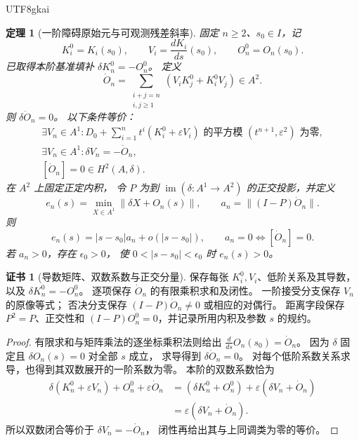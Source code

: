 \documentclass[12pt,a4paper,openany,notitlepage]{report}
\theoremstyle{plain}
\newtheorem{theorem}{定理}[chapter]
\theoremstyle{definition}
\newtheorem*{certificate}{证书}
\theoremstyle{remark}
\def\mathcal#1{#1}\def\mathsf#1{#1}\def\mathbb#1{#1}%
\begin{document}
\begin{CJK*}{UTF8}{gkai}
\begin{theorem}[一阶障碍原始元与可观测残差斜率]
\label{exp:hom:first-variation}
固定 $n\ge2$、$s_0\in I$，记
\[
 K_i^0=K_i(s_0),\qquad
 V_i=\frac{dK_i}{ds}(s_0),\qquad
 O_n^0=O_n(s_0).
\]
已取得本阶基准填补 $\delta K_n^0=-O_n^0$。
定义
\[
 \dot O_n
 =\sum_{\substack{i+j=n\\i,j\ge1}}
       (V_iK_j^0+K_i^0V_j)\in\mathcal A^2.
\]
则 $\delta\dot O_n=0$。
以下条件等价：
\[
 \begin{gathered}
 \exists V_n\in\mathcal A^1:
 D_0+\sum_{i=1}^{n}t^i(K_i^0+\varepsilon V_i)
 \text{ 的平方模 }(t^{n+1},\varepsilon^2)\text{ 为零},\\
 \exists V_n\in\mathcal A^1:\delta V_n=-\dot O_n,\\
 [\dot O_n]=0\in H^2(\mathcal A,\delta).
 \end{gathered}
\]
在 $\mathcal A^2$ 上固定正定内积，
令 $P$ 为到 $\operatorname{im}(\delta:\mathcal A^1\to\mathcal A^2)$
的正交投影，并定义
\[
 e_n(s)=\min_{X\in\mathcal A^1}\|\delta X+O_n(s)\|,
 \qquad
 a_n=\|(I-P)\dot O_n\|.
\]
则
\[
 e_n(s)=|s-s_0|a_n+o(|s-s_0|),\qquad
 a_n=0\Longleftrightarrow[\dot O_n]=0.
\]
若 $a_n>0$，存在 $\epsilon_0>0$，
使 $0<|s-s_0|<\epsilon_0$ 时 $e_n(s)>0$。
\end{theorem}
\begin{certificate}[导数矩阵、双数系数与正交分量]
保存每张 $K_i^0,V_i$、低阶关系及其导数，
以及 $\delta K_n^0=-O_n^0$。
逐项保存 $\dot O_n$ 的有限乘积求和及闭性。
一阶接受分支保存 $V_n$ 的原像等式；
否决分支保存 $(I-P)\dot O_n\ne0$ 或相应的对偶行。
距离字段保存 $P^2=P$、正交性和
$(I-P)O_n^0=0$，并记录所用内积及参数 $s$ 的规约。
\end{certificate}
\begin{proof}
有限求和与矩阵乘法的逐坐标乘积法则给出
$\frac{d}{ds}O_n(s_0)=\dot O_n$。
因为 $\delta$ 固定且 $\delta O_n(s)=0$ 对全部 $s$ 成立，
求导得到 $\delta\dot O_n=0$。
对每个低阶系数关系求导，也得到其双数展开的一阶系数为零。
本阶的双数系数恰为
\[
 \begin{aligned}
 \delta(K_n^0+\varepsilon V_n)
  +O_n^0+\varepsilon\dot O_n
 &=(\delta K_n^0+O_n^0)
   +\varepsilon(\delta V_n+\dot O_n)\\
 &=\varepsilon(\delta V_n+\dot O_n).
 \end{aligned}
\]
所以双数闭合等价于 $\delta V_n=-\dot O_n$，
闭性再给出其与上同调类为零的等价。


\end{proof}
\end{CJK*}
\end{document}
